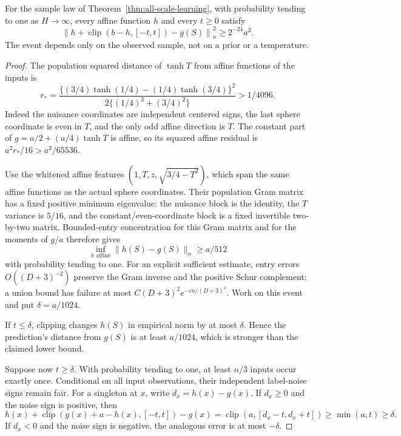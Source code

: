 \begin{lemma}
\label{lem:capped-affine-error}
For the sample law of Theorem~\ref{thm:all-scale-learning}, with probability tending to one as $H\to\infty$, every affine function $h$ and every $t\ge0$ satisfy
\[
 \left\|h+\operatorname{clip}(b-h,[-t,t])-g(S)\right\|_n^2
                          \ge2^{-24}a^2.
\]
The event depends only on the observed sample, not on a prior or a temperature.
\end{lemma}
\begin{proof}
The population squared distance of $\tanh T$ from affine functions of the inputs is
\[
 r_*=
 \frac{\{(3/4)\tanh(1/4)-(1/4)\tanh(3/4)\}^2}
      {2\{(1/4)^2+(3/4)^2\}}>1/4096.
\]
Indeed the nuisance coordinates are independent centered signs, the last sphere coordinate is even in $T$, and the only odd affine direction is $T$. The constant part of $g=a/2+(a/4)\tanh T$ is affine, so its squared affine residual is $a^2r_*/16>a^2/65536$.

Use the whitened affine features $(1,T,z,\sqrt{3/4-T^2})$, which span the same affine functions as the actual sphere coordinates. Their population Gram matrix has a fixed positive minimum eigenvalue: the nuisance block is the identity, the $T$ variance is $5/16$, and the constant/even-coordinate block is a fixed invertible two-by-two matrix. Bounded-entry concentration for this Gram matrix and for the moments of $g/a$ therefore gives
\[
 \inf_{h\text{ affine}}\|h(S)-g(S)\|_n\ge a/512
\]
with probability tending to one. For an explicit sufficient estimate, entry errors $O((D+3)^{-2})$ preserve the Gram inverse and the positive Schur complement; a union bound has failure at most $C(D+3)^2e^{-c n/(D+3)^4}$. Work on this event and put $\delta=a/1024$.

If $t\le\delta$, clipping changes $h(S)$ in empirical norm by at most $\delta$. Hence the prediction's distance from $g(S)$ is at least $a/1024$, which is stronger than the claimed lower bound.

Suppose now $t\ge\delta$. With probability tending to one, at least $n/3$ inputs occur exactly once. Conditional on all input observations, their independent label-noise signs remain fair. For a singleton at $x$, write $d_x=h(x)-g(x)$. If $d_x\ge0$ and the noise sign is positive, then
\[
 h(x)+\operatorname{clip}(g(x)+a-h(x),[-t,t])-g(x)
   =\operatorname{clip}(a,[d_x-t,d_x+t])\ge\min(a,t)\ge\delta.
\]
If $d_x<0$ and the noise sign is negative, the analogous error is at most $-\delta$.


\end{proof}
